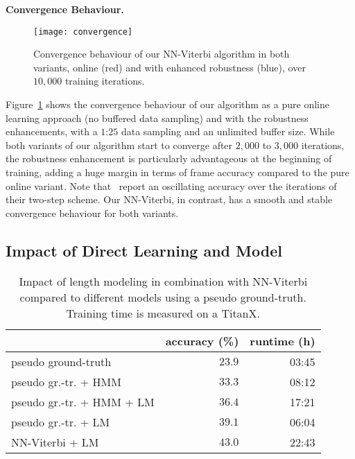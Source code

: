 \documentclass[10pt,twocolumn,letterpaper]{article}
\begin{document}
\textbf{Convergence Behaviour.}
\begin{figure}[tb]
    \centering
    \texttt{[image: convergence]}
    \caption{Convergence behaviour of our NN-Viterbi algorithm in both
             variants, online (red) and with enhanced robustness (blue), over $ 10,000 $ training iterations.}
    \label{fig:convergence}
    \vspace{-0.5cm}
\end{figure}
Figure~\ref{fig:convergence} shows the convergence behaviour of our algorithm
as a pure online learning approach (no buffered data sampling) and with the robustness enhancements,
\ie with a $1$:$25$ data sampling and an unlimited buffer size.
While both variants of our algorithm start to converge after $ 2,000 $ to $ 3,000 $
iterations, the robustness enhancement is particularly advantageous at the beginning
of training, adding a huge margin in terms of frame accuracy compared to the pure
online variant. Note that~\cite{richard2017weakly} report an oscillating accuracy
over the iterations of their two-step scheme. Our NN-Viterbi, in contrast, has a
smooth and stable convergence behaviour for both variants.


\subsection{Impact of Direct Learning and Model}
\label{sec:ablation}

\begin{table}
    \footnotesize
    \begin{tabularx}{0.48\textwidth}{Xrr}
        \toprule
                                                               & accuracy (\%) & runtime (h) \\
        \midrule
            pseudo ground-truth~\cite{richard2017weakly}       & $ 23.9 $ & 03:45 \\
            pseudo gr.-tr. + HMM~\cite{richard2017weakly}      & $ 33.3 $ & 08:12 \\
            pseudo gr.-tr. + HMM + LM                          & $ 36.4 $ & 17:21 \\
            pseudo gr.-tr. + LM                                & $ 39.1 $ & 06:04 \\
            NN-Viterbi + LM                                    & $ 43.0 $ & 22:43 \\
        \bottomrule
    \end{tabularx}
    \caption{Impact of length modeling in combination with NN-Viterbi compared
             to different models using a pseudo ground-truth. Training time is measured on a TitanX.}
    \label{tab:ablation}
    \vspace{-0.5cm}
\end{table}
\end{document}

